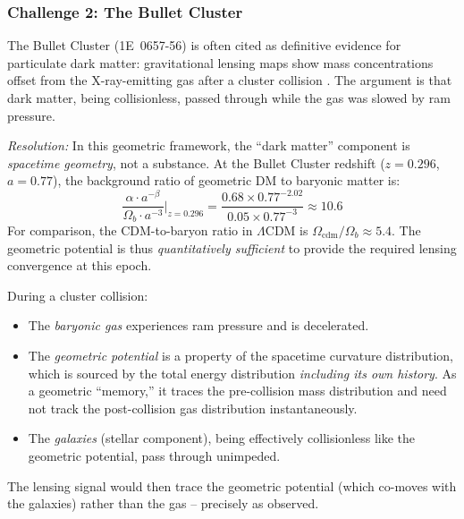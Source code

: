 \documentclass[aps,prd,twocolumn,superscriptaddress,nofootinbib]{revtex4-2}
\begin{document}
\subsubsection{Challenge 2: The Bullet Cluster}

The Bullet Cluster (1E~0657-56) is often cited as definitive evidence for particulate dark matter: gravitational lensing maps show mass concentrations offset from the X-ray-emitting gas after a cluster collision \cite{Clowe2006}. The argument is that dark matter, being collisionless, passed through while the gas was slowed by ram pressure.

\textit{Resolution:} In this geometric framework, the ``dark matter'' component is \textit{spacetime geometry}, not a substance. At the Bullet Cluster redshift ($z = 0.296$, $a = 0.77$), the background ratio of geometric DM to baryonic matter is:
\begin{equation}
\frac{\alpha \cdot a^{-\beta}}{\Omega_b \cdot a^{-3}} \bigg|_{z=0.296} = \frac{0.68 \times 0.77^{-2.02}}{0.05 \times 0.77^{-3}} \approx 10.6
\end{equation}
For comparison, the CDM-to-baryon ratio in $\Lambda$CDM is $\Omega_{\mathrm{cdm}}/\Omega_b \approx 5.4$. The geometric potential is thus \textit{quantitatively sufficient} to provide the required lensing convergence at this epoch.

During a cluster collision:
\begin{itemize}
\item The \textit{baryonic gas} experiences ram pressure and is decelerated.
\item The \textit{geometric potential} is a property of the spacetime curvature distribution, which is sourced by the total energy distribution \textit{including its own history}. As a geometric ``memory,'' it traces the pre-collision mass distribution and need not track the post-collision gas distribution instantaneously.
\item The \textit{galaxies} (stellar component), being effectively collisionless like the geometric potential, pass through unimpeded.
\end{itemize}

The lensing signal would then trace the geometric potential (which co-moves with the galaxies) rather than the gas -- precisely as observed.
\end{document}
